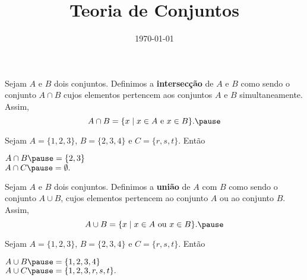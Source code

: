 \documentclass{beamer}
\title{Teoria de Conjuntos}
\author[\autor]{\autor}
\institute[\instituto]{\instituto}
\date{\today}
\begin{document}
    \begin{frame}
        \maketitle
    \end{frame}


    \begin{frame}
        \begin{definicao}
            Sejam $A$ e $B$ dois conjuntos. Definimos a \textbf{intersec{\c c}{\~a}o} de $A$ e $B$ \pause como sendo o conjunto $A \cap B$ \pause cujos elementos pertencem aos conjuntos $A$ e $B$ simultaneamente. \pause Assim,
            \[
                A \cap B = \{x \mid x \in A\mbox{ e }  x \in B\}.\pause
            \]
        \end{definicao}

        \begin{exemplo}
            Sejam $A = \{1, 2, 3\}$, \pause $B = \{2, 3, 4\}$ \pause e $C = \{r, s, t\}$. \pause Ent\~ao\pause
            \begin{center}
                $A \cap B \pause = \{2, 3\}$\pause\\
                $A \cap C \pause = \emptyset.$\pause
            \end{center}
        \end{exemplo}

    \end{frame}

    \begin{frame}
        \begin{definicao}
            Sejam $A$ e $B$ dois conjuntos. \pause Definimos a \textbf{uni{\~a}o} de $A$ com $B$ \pause como sendo o conjunto $A \cup B$, \pause cujos elementos pertencem ao conjunto $A$ ou ao conjunto $B$. \pause Assim,\pause
            \[
                A \cup B = \{x \mid x \in A \mbox{ ou } x \in B\}.\pause
            \]
        \end{definicao}

        \begin{exemplo}
            Sejam $A = \{1, 2, 3\}$, \pause $B = \{2, 3, 4\}$ \pause e $C = \{r, s, t\}$. \pause Ent\~ao\pause
            \begin{center}
                $A \cup B \pause = \{1,2,3,4\}$\pause\\
                $A \cup C \pause = \{1,2,3,r,s,t\}.$\pause
            \end{center}
        \end{exemplo}
    \end{frame}
\end{document}
